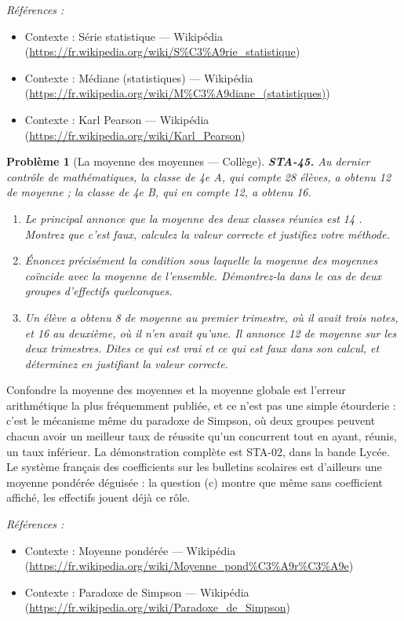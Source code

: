 \documentclass[11pt]{article}
\newtheorem{problem}{Problème}
\newenvironment{refs}{\par\small\noindent\emph{Références :}\begin{itemize}\setlength\itemsep{0pt}}{\end{itemize}\normalsize}
\begin{document}
\begin{refs}
\item Contexte : Série statistique --- Wikipédia (\url{https://fr.wikipedia.org/wiki/S%C3%A9rie_statistique})
\item Contexte : Médiane (statistiques) --- Wikipédia (\url{https://fr.wikipedia.org/wiki/M%C3%A9diane_(statistiques)})
\item Contexte : Karl Pearson --- Wikipédia (\url{https://fr.wikipedia.org/wiki/Karl_Pearson})
\end{refs}

\bigskip

\begin{problem}[{La moyenne des moyennes --- Collège}]
\textbf{STA-45.} Au dernier contrôle de mathématiques, la classe de 4e A, qui compte
28 élèves, a obtenu 12 de moyenne ; la classe de 4e B, qui en compte 12, a obtenu 16.
\begin{enumerate}
\item[(a)] Le principal annonce que \og{} la moyenne des deux classes réunies est 14 \fg{}. Montrez que c'est
faux, calculez la valeur correcte et justifiez votre méthode.
\item[(b)] Énoncez précisément la condition sous laquelle la moyenne des moyennes coïncide avec la
moyenne de l'ensemble. Démontrez-la dans le cas de deux groupes d'effectifs quelconques.
\item[(c)] Un élève a obtenu 8 de moyenne au premier trimestre, où il avait trois notes, et 16 au
deuxième, où il n'en avait qu'une. Il annonce 12 de moyenne sur les deux trimestres. Dites ce qui
est vrai et ce qui est faux dans son calcul, et déterminez en justifiant la valeur correcte.
\end{enumerate}

\end{problem}

\noindent Confondre la moyenne des moyennes et la moyenne globale est l'erreur
arithmétique la plus fréquemment publiée, et ce n'est pas une simple étourderie : c'est le
mécanisme même du paradoxe de Simpson, où deux groupes peuvent chacun avoir un meilleur taux de
réussite qu'un concurrent tout en ayant, réunis, un taux inférieur. La démonstration complète est
STA-02, dans la bande Lycée. Le système français des coefficients sur les bulletins scolaires est
d'ailleurs une moyenne pondérée déguisée : la question (c) montre que même sans coefficient
affiché, les effectifs jouent déjà ce rôle.

\begin{refs}
\item Contexte : Moyenne pondérée --- Wikipédia (\url{https://fr.wikipedia.org/wiki/Moyenne_pond%C3%A9r%C3%A9e})
\item Contexte : Paradoxe de Simpson --- Wikipédia (\url{https://fr.wikipedia.org/wiki/Paradoxe_de_Simpson})
\end{refs}
\end{document}
